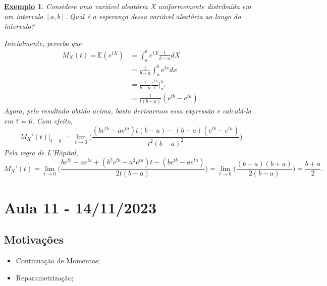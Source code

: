 \documentclass{article}
\newtheorem{example}{\underline{Exemplo}}
\begin{document}
\begin{example}
  Considere uma variável aleatória X uniformemente distribuída em um intervalo \([a, b]\). Qual é a esperança dessa variável aleatória ao longo do intervalo?

  Inicialmente, perceba que 
  \begin{align*}
    M_{X}(t) = \mathbb{E}(e^{tX}) &= \int_{a}^{b}e^{tX}\frac{1}{b-a}dX\\
                                  &= \frac{1}{b-a}\int_{a}^{b}e^{tx}dx\\
                                  &= \frac{1}{b-a}\frac{e^{tX}}{t}\biggl|_{a}^{b}\biggr.\\
                                  &= \frac{1}{t(b-a)}(e^{tb}-e^{ta}).
  \end{align*}
  Agora, pelo resultado obtido acima, basta derivarmos essa expressão e calculá-la em t = 0. Com efeito, 
  \[
    M_{X}'(t)\biggl|_{t=0}^{}\biggr. = \lim_{t\to 0}\biggl(\frac{(b e^{tb}-a e^{ta})t(b-a) - (b-a)(e^{tb}-e^{ta})}{t^{2}(b-a)^{2}}\biggr)  
  \]
  Pela regra de L'Hôpital,
  \[
    M_{X}'(t) = \lim_{t\to 0}\biggl(\frac{be^{tb} - ae^{ta} + (b^{2}e^{tb} - a ^{2}e^{ta})t - (be^{tb}-ae^{ta})}{2t(b-a)}\biggr) = \lim_{t\to 0}\biggl(\frac{(b-a)(b+a)}{2(b-a)}\biggr) = \frac{b+a}{2}.
  \]
\end{example}
\newpage

\section{Aula 11 - 14/11/2023}
\subsection{Motivações}
\begin{itemize}
  \item Continuação de Momentos;
  \item Reparametrização;
\end{itemize}
\end{document}
